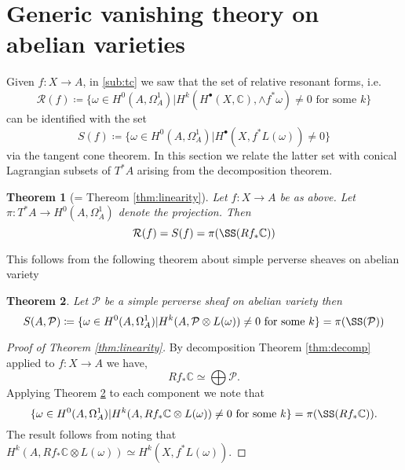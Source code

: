 \documentclass[11pt,reqno]{amsart}
\newtheorem{theorem}{Theorem}[section]
\theoremstyle{definition}
\theoremstyle{remark}
\theoremstyle{cited}
\theoremstyle{citeddef}
\newcommand{\sP}{\mathcal{P}}
\newcommand{\sR}{\mathcal{R}}
\newcommand{\bbC}{\mathbb{C}}
\begin{document}
\section{Generic vanishing theory on abelian varieties}
Given $f\colon X\to A$, in \ref{sub:tc} we saw that the set of relative resonant forms, i.e.
\[\sR(f)\coloneqq \{\omega\in H^0(A,\Omega_A^1)| H^k(H^{\bullet}(X,\bbC),\wedge f^*\omega) \neq 0 \text{ for some }k\}\]
can be identified with the set 
\[S(f)\coloneqq \{\omega\in H^0(A,\Omega_A^1)| H^{\bullet}(X, f^*L(\omega))\neq 0\}\]
via the tangent cone theorem.
In this section we relate the latter set with conical Lagrangian subsets of $T^*A$ arising from the decomposition theorem.
\begin{theorem}[= Thereom \ref{thm:linearity}]
Let $f\colon X\to A$ be as above. Let $\pi\colon T^*A\to H^0(A,\Omega_A^1)$ denote the projection. Then
\[\sR(f) = S(f) = \pi(\SS(Rf_*\bbC))\]
\end{theorem}
This follows from the following theorem about simple perverse sheaves on abelian variety
\begin{theorem}
Let $\sP$ be a simple perverse sheaf on abelian variety then
\[S(A,\sP)\coloneqq \{\omega\in H^0(A,\Omega_A^1)| H^k(A, \sP\otimes L(\omega)) \neq 0 \text{ for some } k\} = \pi(\SS(\sP))\]
\label{thm:perverse}
\end{theorem}

\begin{proof}[Proof of Theorem \ref{thm:linearity}]
By decomposition Theorem \ref{thm:decomp} applied to $f\colon X\to A$
we have, 
\[Rf_*\bbC\simeq \bigoplus \sP.\]
Applying Theorem \ref{thm:perverse} to each component we note that
\[\{\omega\in H^0(A,\Omega_A^1)| H^k(A, Rf_*\bbC\otimes L(\omega)) \neq 0 \text{ for some } k\} = \pi(\SS(Rf_*\bbC)).\]
The result follows from noting that $H^k(A, Rf_*\bbC\otimes L(\omega)) \simeq H^k(X, f^*L(\omega))$.
\end{proof}
\end{document}
